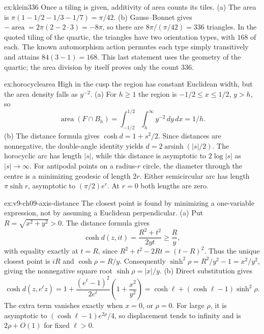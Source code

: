 \begin{solution}{ex:klein336}
\idea Once a tiling is given, additivity of area counts its tiles.
\writeup (a) The area is $\pi(1-1/2-1/3-1/7)=\pi/42$.
(b) Gauss--Bonnet gives $-\operatorname{area}=2\pi(2-2\cdot3)=-8\pi$, so there are $8\pi/(\pi/42)=336$ triangles. In the quoted tiling of the quartic, the triangles have two orientation types, with $168$ of each. The known automorphism action permutes each type simply transitively and attains $84(3-1)=168$. This last statement uses the geometry of the quartic; the area division by itself proves only the count $336$.
\end{solution}

\begin{solution}{ex:horocyclearea}
\idea High in the cusp the region has constant Euclidean width, but the area density falls as $y^{-2}$.
\writeup (a) For $h\ge1$ the region is $-1/2\le x\le1/2$, $y>h$, so
\[
\operatorname{area}(F\cap B_h)=\int_{-1/2}^{1/2}\int_h^\infty y^{-2}\,dy\,dx=1/h.
\]
(b) The distance formula gives $\cosh d=1+s^2/2$. Since distances are nonnegative, the double-angle identity yields $d=2\operatorname{arsinh}(|s|/2)$. The horocyclic arc has length $|s|$, while this distance is asymptotic to $2\log|s|$ as $|s|\to\infty$. For antipodal points on a radius-$r$ circle, the diameter through the centre is a minimizing geodesic of length $2r$. Either semicircular arc has length $\pi\sinh r$, asymptotic to $(\pi/2)e^r$. At $r=0$ both lengths are zero.
\end{solution}

\begin{solution}{ex:v9-ch09-axis-distance}
\idea The closest point is found by minimizing a one-variable expression, not by assuming a Euclidean perpendicular.
\writeup (a) Put $R=\sqrt{x^2+y^2}>0$. The distance formula gives
\[
\cosh d(z,it)=\frac{R^2+t^2}{2yt}\ge\frac Ry,
\]
with equality exactly at $t=R$, since $R^2+t^2-2Rt=(t-R)^2$. Thus the unique closest point is $iR$ and $\cosh\rho=R/y$. Consequently $\sinh^2\rho=R^2/y^2-1=x^2/y^2$, giving the nonnegative square root $\sinh\rho=|x|/y$.
(b) Direct substitution gives
\[
\cosh d(z,e^\ell z)
=1+\frac{(e^\ell-1)^2}{2e^\ell}\left(1+\frac{x^2}{y^2}\right)
=\cosh\ell+(\cosh\ell-1)\sinh^2\rho.
\]
The extra term vanishes exactly when $x=0$, or $\rho=0$. For large $\rho$, it is asymptotic to $(\cosh\ell-1)e^{2\rho}/4$, so displacement tends to infinity and is $2\rho+O(1)$ for fixed $\ell>0$.
\end{solution}

